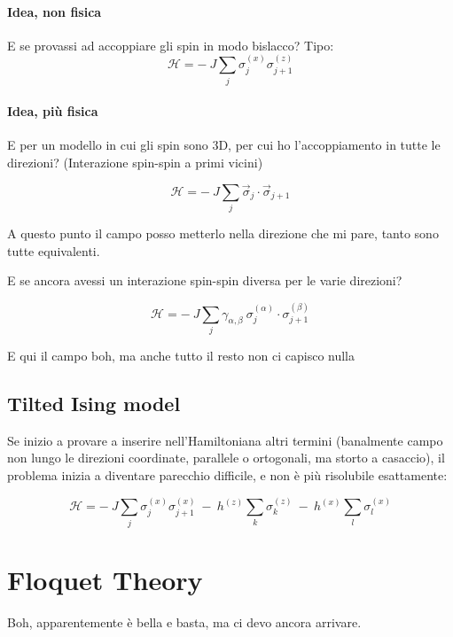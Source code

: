 \documentclass[a4paper,10pt]{article}
\begin{document}
\paragraph{Idea, non fisica} E se provassi ad accoppiare gli spin in modo bislacco? Tipo:
\begin{equation}
\mathcal{H} = -~ J \sum_j \sigma_j^{(x)} \sigma_{j+1}^{(z)}
\end{equation}

\paragraph{Idea, più fisica} E per un modello in cui gli spin sono $3$D, per cui ho l'accoppiamento in tutte le direzioni? (Interazione spin-spin a primi vicini)


\begin{equation}
\mathcal{H} = -~ J \sum_j \vec{\sigma}_j \cdot \vec{\sigma}_{j+1}
\end{equation}

\noindent A questo punto il campo posso metterlo nella direzione che mi pare, tanto sono tutte equivalenti.

E se ancora avessi un interazione spin-spin diversa per le varie direzioni?

\begin{equation}
\mathcal{H} = -~ J \sum_j \gamma_{\alpha, \beta} ~ \sigma_j^{(\alpha)} \cdot \sigma_{j+1}^{(\beta)}
\end{equation}

\noindent E qui il campo boh, ma anche tutto il resto non ci capisco nulla


\subsection{Tilted Ising model} Se inizio a provare a inserire nell'Hamiltoniana altri termini (banalmente campo non lungo le direzioni coordinate, parallele o ortogonali, ma storto a casaccio), il problema inizia a diventare parecchio difficile, e non è più risolubile esattamente:

\begin{equation}
\mathcal{H} = -~ J \sum_j \sigma_j^{(x)} \sigma_{j+1}^{(x)} ~-~ h^{(z)} \sum_k \sigma_k^{(z)} ~-~ h^{(x)} \sum_l \sigma_l^{(x)}
\end{equation}

\section{Floquet Theory}
Boh, apparentemente è bella e basta, ma ci devo ancora arrivare.
\end{document}
